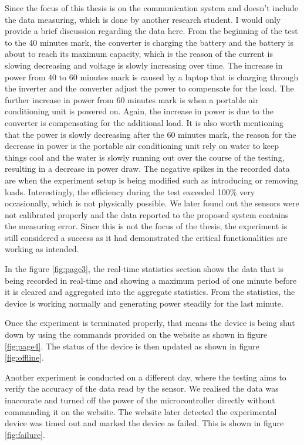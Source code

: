 \documentclass[../thesis.tex]{subfiles}
\begin{document}
Since the focus of this thesis is on the communication system and doesn't include the data measuring, which is done by another research student. I would only provide a brief discussion regarding the data here. From the beginning of the test to the 40 minutes mark, the converter is charging the battery and the battery is about to reach its maximum capacity, which is the reason of the current is slowing decreasing and voltage is slowly increasing over time. The increase in power from 40 to 60 minutes mark is caused by a laptop that is charging through the inverter and the converter adjust the power to compensate for the load. The further increase in power from 60 minutes mark is when a portable air conditioning unit is powered on. Again, the increase in power is due to the converter is compensating for the additional load. It is also worth mentioning that the power is slowly decreasing after the 60 minutes mark, the reason for the decrease in power is the portable air conditioning unit rely on water to keep things cool and the water is slowly running out over the course of the testing, resulting in a decrease in power draw. The negative spikes in the recorded data are when the experiment setup is being modified such as introducing or removing loads. Interestingly, the efficiency during the test exceeded 100\% very occasionally, which is not physically possible. We later found out the sensors were not calibrated properly and the data reported to the proposed system contains the measuring error. Since this is not the focus of the thesis, the experiment is still considered a success as it had demonstrated the critical functionalities are working as intended.



In the figure \ref{fig:page3}, the real-time statistics section shows the data that is being recorded in real-time and showing a maximum period of one minute before it is cleared and aggregated into the aggregate statistics. From the statistics, the device is working normally and generating power steadily for the last minute.

Once the experiment is terminated properly, that means the device is being shut down by using the commands provided on the website as shown in figure \ref{fig:page4}. The status of the device is then updated as shown in figure \ref{fig:offline}.

Another experiment is conducted on a different day, where the testing aims to verify the accuracy of the data read by the sensor. We realised the data was inaccurate and turned off the power of the microcontroller directly without commanding it on the website. The website later detected the experimental device was timed out and marked the device as failed. This is shown in figure \ref{fig:failure}.
\end{document}
